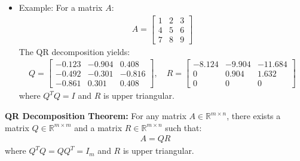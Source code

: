 \begin{frame}
    \begin{itemize}
        \item Example: For a matrix $A$:
        {\small
        \begin{align*}
            A = \begin{bmatrix}
                1 & 2 & 3 \\    
                4 & 5 & 6 \\
                7 & 8 & 9
            \end{bmatrix}
        \end{align*}
        The QR decomposition yields:
        \begin{align*}
            Q = \begin{bmatrix}
                -0.123 & -0.904 & 0.408 \\
                -0.492 & -0.301 & -0.816 \\
                -0.861 & 0.301 & 0.408
            \end{bmatrix}, \quad
            R = \begin{bmatrix}
                -8.124 & -9.904 & -11.684 \\
                0 & 0.904 & 1.632 \\
                0 & 0 & 0
            \end{bmatrix}
        \end{align*}
        where $Q^T Q = I$ and $R$ is upper triangular.
        }
    \end{itemize}
\end{frame}

\begin{frame}
    \begin{block}{\textbf{QR Decomposition Theorem:}} For any matrix $A \in \mathbb{R}^{m \times n}$, there exists a matrix $Q \in \mathbb{R}^{m \times m}$ and a matrix $R \in \mathbb{R}^{m \times n}$ such that:
        \begin{align*}
            A = QR
        \end{align*}
        where $Q^T Q =QQ^T=I_m$ and $R$ is upper triangular.
    \end{block}
\end{frame}


